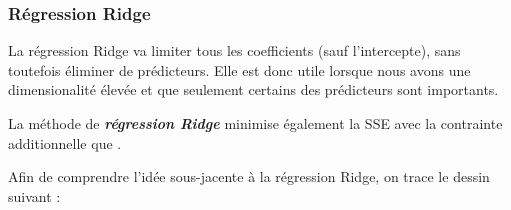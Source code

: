 \documentclass[french]{article}
\begin{document}
\begin{multicols*}{2}
\subsubsection{Régression Ridge}
\begin{rappel_enhanced}[Contexte]
La régression Ridge va limiter tous les coefficients (sauf l'intercepte), sans toutefois éliminer de prédicteurs. Elle est donc utile lorsque nous avons une dimensionalité élevée et que seulement certains des prédicteurs sont importants.
\end{rappel_enhanced}

\begin{definitionNOHFILL}
La méthode de \textbf{\textit{régression Ridge}} minimise également la SSE avec la contrainte additionnelle que .

\begin{definitionNOHFILLsub}[Visualisation pour $p = 2$]
Afin de comprendre l'idée sous-jacente à la régression Ridge, on trace le dessin suivant : 
\begin{center}
\begin{tikzpicture}[x=0.75pt,y=0.75pt,yscale=-1,xscale=1]


\end{tikzpicture}
\end{center}
\end{definitionNOHFILLsub}
\end{definitionNOHFILL}
\end{multicols*}
\end{document}
